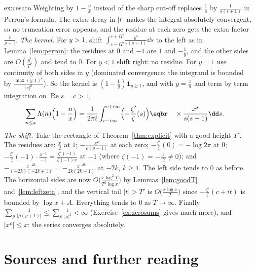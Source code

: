 \begin{solution}{ex:cesaro}
\idea Weighting by $1-\frac nx$ instead of the sharp cut-off replaces $\frac1s$ by $\frac1{s(s+1)}$ in Perron's formula. The extra decay in $|t|$ makes the integral absolutely convergent, so no truncation
error appears, and the residue at each zero gets the extra factor $\frac1{\rho+1}$.
\writeup \emph{The kernel.} For $y>1$, shift $\int_{c-iT}^{c+iT}\frac{y^s}{s(s+1)}\dd s$ to the left as in Lemma~\ref{lem:perron}: the residues at $0$ and $-1$ are $1$ and $-\frac1y$, and the other sides are
$O(\frac{y^c}{T^2})$ and tend to $0$. For $y<1$ shift right: no residue. For $y=1$ use continuity of both sides in $y$ (dominated convergence: the integrand is bounded by $\frac{\max(y,1)^c}{|s|^2}$). So the kernel is
$(1-\frac1y)\mathbf1_{y\ge1}$, and with $y=\frac xn$ and term by term integration on $\operatorname{Re}s=c>1$,
\[
\begin{aligned}\sum_{n\le x}\Lambda(n)\Bigl(1-\frac nx\Bigr)&=\frac1{2\pi i}\int_{c-i\infty}^{c+i\infty}\Bigl(-\frac{\zeta'}\zeta(s)\Bigr)\eqbr\quad\times\frac{x^s}{s(s+1)}\dd s.\end{aligned}
\]
\emph{The shift.} Take the rectangle of Theorem~\ref{thm:explicit} with a good height $T'$. The residues are: $\frac x2$ at $1$; $-\frac{x^\rho}{\rho(\rho+1)}$ at each zero; $-\frac{\zeta'}\zeta(0)=-\log2\pi$ at $0$;
$-\frac{\zeta'}\zeta(-1)\cdot\frac{x^{-1}}{-1}=\frac{\zeta'(-1)}{\zeta(-1)x}$ at $-1$ (where $\zeta(-1)=-\frac1{12}\ne0$); and $-\frac{x^{-2k}}{(-2k)(-2k+1)}=-\frac{x^{-2k}}{2k(2k-1)}$ at $-2k$, $k\ge1$. The left side tends to $0$ as before. The horizontal sides
are now $O\bigl(\frac{x\log^2T}{T^2\log x}\bigr)$ by Lemmas~\ref{lem:goodT} and~\ref{lem:leftzeta}, and the vertical tail $|t|>T'$ is $O\bigl(\frac{x\log x}{T}\bigr)$ since $-\frac{\zeta'}\zeta(c+it)$ is bounded by $\log x+A$. Everything tends to $0$ as $T\to\infty$.
Finally $\sum_\rho\frac1{|\rho(\rho+1)|}\le\sum_\rho\frac1{|\rho|^2}<\infty$ (Exercise~\ref{ex:zerosums} gives much more), and $|x^\rho|\le x$: the series converges absolutely.
\end{solution}

\section*{Sources and further reading}


